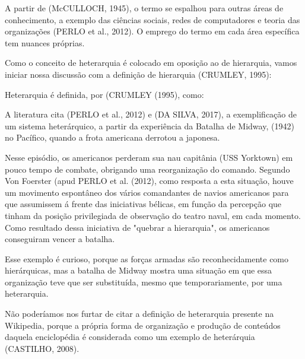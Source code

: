 A partir de (McCULLOCH, 1945), o termo se espalhou para outras áreas de conhecimento, a exemplo das ciências sociais, redes de computadores e teoria das organizações (PERLO et al., 2012). O emprego do termo em cada área específica tem nuances próprias.

Como o conceito de heterarquia é colocado em oposição ao de hierarquia, vamos iniciar nossa discussão com a definição de hierarquia (CRUMLEY, 1995):


\noindent\begin{center}\mbox{\centering{}}\end{center}


Heterarquia é definida, por (CRUMLEY (1995), como:


\noindent\begin{center}\mbox{\centering{}}\end{center}


A literatura cita (PERLO et al., 2012) e (DA SILVA, 2017), a exemplificação de um sistema heterárquico, a partir da experiência da Batalha de Midway, (1942) no Pacífico, quando a frota americana derrotou a japonesa.

Nesse episódio, os americanos perderam sua nau capitânia (USS Yorktown) em pouco tempo de combate, obrigando uma reorganização do comando. Segundo Von Foerster (apud PERLO et al. (2012), como resposta a esta situação, houve um movimento espontâneo dos vários comandantes de navios americanos para que assumissem á frente das iniciativas bélicas, em função da percepção que tinham da posição privilegiada de observação do teatro naval, em cada momento. Como resultado dessa iniciativa de "quebrar a hierarquia", os americanos conseguiram vencer a batalha.

Esse exemplo é curioso, porque as forças armadas são reconhecidamente como hierárquicas, mas a batalha de Midway mostra uma situação em que essa organização teve que ser substituída, mesmo que temporariamente, por uma heterarquia.

Não poderíamos nos furtar de citar a definição de heterarquia presente na Wikipedia, porque a própria forma de organização e produção de conteúdos daquela enciclopédia é considerada como um exemplo de heterárquia  (CASTILHO, 2008).

